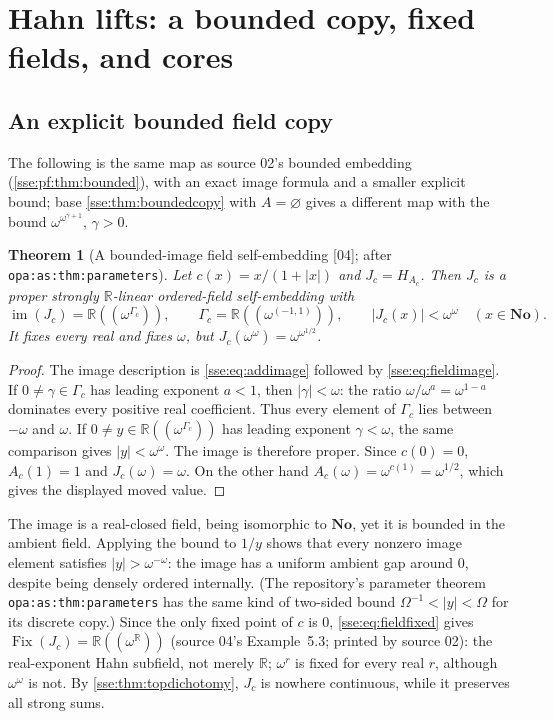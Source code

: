 \documentclass[11pt,a4paper]{article}
\numberwithin{equation}{section}
\theoremstyle{plain}
\newtheorem{theorem}{Theorem}[section]
\theoremstyle{definition}
\theoremstyle{remark}
\newcommand{\No}{\mathbf{No}}
\newcommand{\R}{\mathbb{R}}
\newcommand{\Fix}{\operatorname{Fix}}
\newcommand{\im}{\operatorname{im}}
\newcommand{\NF}[1]{\R((\omega^{#1}))}
\newcommand{\lbl}[1]{\nolinkurl{#1}}%
\newcommand{\src}[1]{\textup{\textsf{\small[#1]}}}%
\begin{document}
\section{Hahn lifts: a bounded copy, fixed fields, and cores}\label{sse:at:sec:hahn}

\subsection{An explicit bounded field copy}
The following is the same map as source 02's bounded embedding
(\cref{sse:pf:thm:bounded}), with an exact image formula and a smaller
explicit bound; base \cref{sse:thm:boundedcopy} with $A=\varnothing$ gives a
different map with the bound $\omega^{\omega^{\gamma+1}}$, $\gamma>0$.

\begin{theorem}[A bounded-image field self-embedding \src{04}; after \lbl{opa:as:thm:parameters}]
\label{sse:at:thm:bounded-hahn}
Let $c(x)=x/(1+|x|)$ and $J_c=H_{A_c}$. Then $J_c$ is a proper strongly
$\R$-linear ordered-field self-embedding with
\begin{equation}\label{sse:at:eq:boundJ}
 \im(J_c)=\NF{\Gamma_c},\qquad
 \Gamma_c=\NF{(-1,1)},\qquad
 |J_c(x)|<\omega^\omega\quad(x\in\No).
\end{equation}
It fixes every real and fixes $\omega$, but
$J_c(\omega^\omega)=\omega^{\omega^{1/2}}$.
\end{theorem}
\begin{proof}
The image description is \eqref{sse:eq:addimage} followed by
\eqref{sse:eq:fieldimage}. If $0\ne\gamma\in\Gamma_c$ has leading exponent
$a<1$, then $|\gamma|<\omega$: the ratio $\omega/\omega^a=\omega^{1-a}$
dominates every positive real coefficient. Thus every element of $\Gamma_c$
lies between $-\omega$ and $\omega$. If $0\ne y\in\NF{\Gamma_c}$ has leading
exponent $\gamma<\omega$, the same comparison gives $|y|<\omega^\omega$. The
image is therefore proper. Since $c(0)=0$, $A_c(1)=1$ and
$J_c(\omega)=\omega$. On the other hand $A_c(\omega)=\omega^{c(1)}=\omega^{1/2}$,
which gives the displayed moved value.
\end{proof}

The image is a real-closed field, being isomorphic to $\No$, yet it is bounded
in the ambient field. Applying the bound to $1/y$ shows that every nonzero
image element satisfies $|y|>\omega^{-\omega}$: the image has a uniform
ambient gap around $0$, despite being densely ordered internally. (The
repository's parameter theorem \lbl{opa:as:thm:parameters} has the same kind
of two-sided bound $\Omega^{-1}<|y|<\Omega$ for its discrete copy.) Since the
only fixed point of $c$ is $0$, \eqref{sse:eq:fieldfixed} gives
$\Fix(J_c)=\NF{\R}$ (source 04's Example~5.3; printed by source 02): the
real-exponent Hahn subfield, not merely $\R$; $\omega^r$ is fixed for every
real $r$, although $\omega^\omega$ is not. By \cref{sse:thm:topdichotomy},
$J_c$ is nowhere continuous, while it preserves all strong sums.
\end{document}
